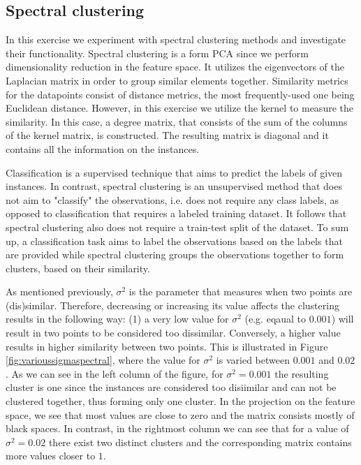 \documentclass[a4paper, 11pt, one column]{article}
\begin{document}
\subsection{Spectral clustering}
In this exercise we experiment with spectral clustering methods and investigate their functionality. Spectral clustering is a form PCA since we perform dimensionality reduction in the feature space. It utilizes the eigenvectors of the Laplacian matrix in order to group similar elements together. Similarity metrics for the datapoints consist of distance metrics, the most frequently-used one being Euclidean distance. However, in this exercise we utilize the kernel to measure the similarity. In this case, a degree matrix, that consists of the sum of the columns of the kernel matrix, is constructed. The resulting matrix is diagonal and it contains all the information on the instances. 

Classification is a supervised technique that aims to predict the labels of given instances. In contrast, spectral clustering is an unsupervised method that does not aim to "classify" the observations, i.e. does not require any class labels, as opposed to classification that requires a labeled training dataset. It follows that spectral clustering also does not require a train-test split of the dataset. To sum up, a classification task aims to label the observations based on the labels that are provided while spectral clustering groups the observations together to form clusters, based on their similarity. 

As mentioned previously, $\sigma^2$ is the parameter that measures when two points are (dis)similar. Therefore, decreasing or increasing its value affects the clustering results in the following way: (1) a very low value for $\sigma^2$ (e.g. eqaual to $0.001$) will result in two points to be considered too dissimilar. Conversely, a higher value results in higher similarity between two points. This is illustrated in Figure \ref{fig:varioussigmaspectral}, where the value for $\sigma^2$ is varied between $0.001$ and $0.02$. As we can see in the left column of the figure, for $\sigma^2 = 0.001$ the resulting cluster is one since the instances are considered too disiimilar and can not be clustered together, thus forming only one cluster. In the projection on the feature space, we see that most values are close to zero and the matrix consists mostly of black spaces. In contrast, in the rightmost column we can see that for a value of $\sigma^2 = 0.02$ there exist two distinct clusters and the corresponding matrix contains more values closer to $1$. 
\end{document}
